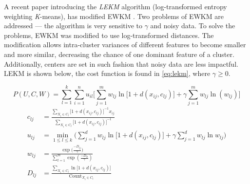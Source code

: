 \documentclass[../report.tex]{subfiles}
\begin{document}
A recent paper introducing the \textit{LEKM} algorithm (log-transformed entropy weighting \textit{K}-means), has modified EWKM \cite{Gan2016}. Two problems of EWKM are addressed --- the algorithm is very sensitive to $\gamma$ and noisy data. To solve the problems, EWKM was modified to use log-transformed distances. The modification allows intra-cluster variances of different features to become smaller and more similar, decreasing the chance of one dominant feature of a cluster. Additionally, centers are set in such fashion that noisy data are less impactful. LEKM is shown below, the cost function is found in \cref{eq:lekm}, where $\gamma \geq 0$.

\begin{equation}
\label{eq:lekm}
P(U,C,W) = \sum^k_{l=1} \sum^n_{i=1} u_{il} \Bigg[ \sum^m_{j=1} w_{ lj } \ln\big[1 + d(x_{ij},c_{lj})\big] + \gamma \sum_{j=1}^{m}{ w_{lj} \ln (w_{lj}) } \Bigg]
\end{equation}
\begin{align}
c_{lj} &= \frac{\sum_{X_i \in C_l}{ {\big[1 + d(x_{ij},c_{ lj })\big]}^{-1} x_{ij} }}{\sum_{X_i \in C_l}{\big[1 + d(x_{ij},c_{ lj })\big]}^{-1}} \\
u_{lj} &= \min_{1 \leq l \leq k}\Bigg(\sum_{j=1}^{d} w_{lj} \ln\big[1 + d(x_{ij},c_{ lj })\big] + \gamma \sum_{j=1}^{d} w_{lj} \ln w_{lj}\Bigg) \\
w_{lj} &= \frac{\exp({\frac{-D_{lj}}{\gamma})}}{\sum_{t=1}^{m}{\exp{(\frac{-D_{lt}}{\gamma})}}} \\
\label{eq:lekm2}
D_{ lj } &= \frac{\sum_{X_i \in C_l}{\ln\big[1 + d(x_{ij},c_{ lj })\big]}}{\text{Count}_{X_i \in C_l}}
\end{align}


\end{document}
